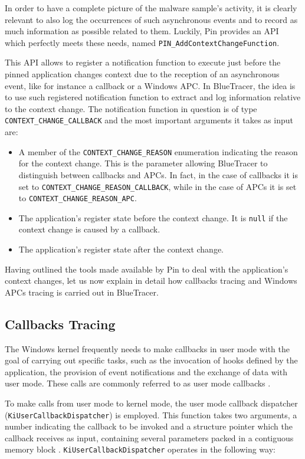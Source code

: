 In order to have a complete picture of the malware sample's activity, it is clearly relevant to also log the occurrences of such asynchronous events and to record as much information as possible related to them. Luckily, Pin provides an API which perfectly meets these needs, named \texttt{PIN\_AddContextChangeFunction}.
 
This API allows to register a notification function to execute just before the pinned application changes context due to the reception of an asynchronous event, like for instance a callback or a Windows APC. In BlueTracer, the idea is to use such registered notification function to extract and log information relative to the context change. The notification function in question is of type \texttt{CONTEXT\_CHANGE\_CALLBACK} and the most important arguments it takes as input are:
\begin{itemize}
\item A member of the \texttt{CONTEXT\_CHANGE\_REASON} enumeration indicating the reason for the context change. This is the parameter allowing BlueTracer to distinguish between callbacks and APCs. In fact, in the case of callbacks it is set to \texttt{CONTEXT\_CHANGE\_REASON\_CALLBACK}, while in the case of APCs it is set to \texttt{CONTEXT\_CHANGE\_REASON\_APC}. 
\item The application's register state before the context change. It is \texttt{null} if the context change is caused by a callback.
\item The application's register state after the context change.  
\end{itemize}      
Having outlined the tools made available by Pin to deal with the application's context changes, let us now explain in detail how callbacks tracing and Windows APCs tracing is carried out in BlueTracer.

\subsection{Callbacks Tracing}

The Windows kernel frequently needs to make callbacks in user mode with the goal of carrying out specific tasks, such as the invocation of hooks defined by the application, the provision of event notifications and the exchange of data with user mode. These calls are commonly referred to as user mode callbacks \cite{UMCallbacks}. 

To make calls from user mode to kernel mode, the user mode callback dispatcher (\texttt{KiUserCallbackDispatcher}) is employed. This function takes two arguments, a number indicating the callback to be invoked and a structure pointer which the callback receives as input, containing several parameters packed in a contiguous memory block \cite{UCDispatcher}. \texttt{KiUserCallbackDispatcher} operates in the following way:


